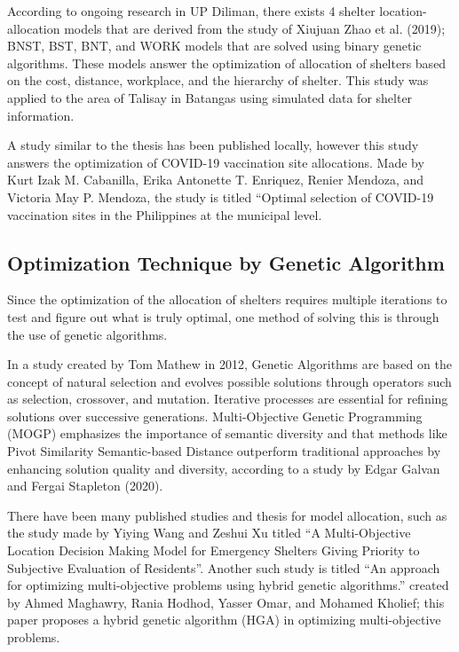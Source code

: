 According to ongoing research in UP Diliman, there exists 4 shelter location-allocation models that are derived from the study of Xiujuan Zhao et al. (2019); BNST, BST, BNT, and WORK models that are solved using binary genetic algorithms. These models answer the optimization of allocation of shelters based on the cost, distance, workplace, and the hierarchy of shelter. This study was applied to the area of Talisay in Batangas using simulated data for shelter information. \parencite{Xiujuan2019}

A study similar to the thesis has been published locally, however this study answers the optimization of COVID-19 vaccination site allocations. Made by Kurt Izak M. Cabanilla, Erika Antonette T. Enriquez, Renier Mendoza, and Victoria May P. Mendoza, the study is titled “Optimal selection of COVID-19 vaccination sites in the Philippines at the municipal level. \parencite{Kurt2021}

\subsection{Optimization Technique by Genetic Algorithm}

Since the optimization of the allocation of shelters requires multiple iterations to test and figure out what is truly optimal, one method of solving this is through the use of genetic algorithms.

In a study created by Tom Mathew in 2012, Genetic Algorithms are based on the concept of natural selection and evolves possible solutions through operators such as selection, crossover, and mutation. Iterative processes are essential for refining solutions over successive generations. Multi-Objective Genetic Programming (MOGP) emphasizes the importance of semantic diversity and that methods like Pivot Similarity Semantic-based Distance outperform traditional approaches by enhancing solution quality and diversity, according to a study by Edgar Galvan and Fergai Stapleton (2020). \parencite{Mathew2012}

There have been many published studies and thesis for model allocation, such as the study made by Yiying Wang and Zeshui Xu titled “A Multi-Objective Location Decision Making Model for Emergency Shelters Giving Priority to Subjective Evaluation of Residents”. Another such study is titled “An approach for optimizing multi-objective problems using hybrid genetic algorithms.” created by Ahmed Maghawry, Rania Hodhod, Yasser Omar, and Mohamed Kholief; this paper proposes a hybrid genetic algorithm (HGA) in optimizing multi-objective problems. \parencite{Yiying2022}

